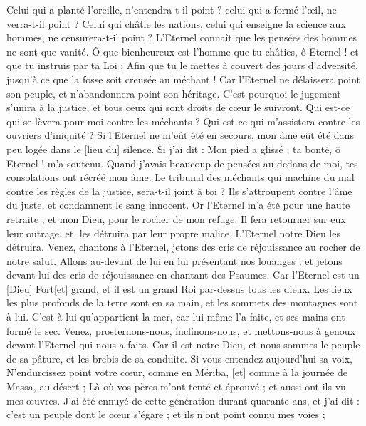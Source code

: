 \begin{multicols}{2}
Celui qui a planté l'oreille, n'entendra-t-il point ? celui qui a formé l'œil, ne verra-t-il point ?
Celui qui châtie les nations, celui qui enseigne la science aux hommes, ne censurera-t-il point ?
L'Eternel connaît que les pensées des hommes ne sont que vanité.
Ô que bienheureux est l'homme que tu châties, ô Eternel ! et que tu instruis par ta Loi ;
Afin que tu le mettes à couvert des jours d'adversité, jusqu’à ce que la fosse soit creusée au méchant !
Car l'Eternel ne délaissera point son peuple, et n'abandonnera point son héritage.
C'est pourquoi le jugement s'unira à la justice, et tous ceux qui sont droits de cœur le suivront.
Qui est-ce qui se lèvera pour moi contre les méchants ? Qui est-ce qui m'assistera contre les ouvriers d'iniquité ?
Si l'Eternel ne m'eût été en secours, mon âme eût été dans peu logée dans le [lieu du] silence.
Si j'ai dit : Mon pied a glissé ; ta bonté, ô Eternel ! m'a soutenu.
Quand j'avais beaucoup de pensées au-dedans de moi, tes consolations ont récréé mon âme.
Le tribunal des méchants qui machine du mal contre les règles de la justice, sera-t-il joint à toi ?
Ils s'attroupent contre l'âme du juste, et condamnent le sang innocent.
Or l'Eternel m'a été pour une haute retraite ; et mon Dieu, pour le rocher de mon refuge.
Il fera retourner sur eux leur outrage, et, les détruira par leur propre malice. L'Eternel notre Dieu les détruira.
\VerseOne{}Venez, chantons à l'Eternel, jetons des cris de réjouissance au rocher de notre salut.
Allons au-devant de lui en lui présentant nos louanges ; et jetons devant lui des cris de réjouissance en chantant des Psaumes.
Car l'Eternel est un [Dieu] Fort[et] grand, et il est un grand Roi par-dessus tous les dieux.
Les lieux les plus profonds de la terre sont en sa main, et les sommets des montagnes sont à lui.
C'est à lui qu'appartient la mer, car lui-même l'a faite, et ses mains ont formé le sec.
Venez, prosternons-nous, inclinons-nous, et mettons-nous à genoux devant l'Eternel qui nous a faits.
Car il est notre Dieu, et nous sommes le peuple de sa pâture, et les brebis de sa conduite. Si vous entendez aujourd'hui sa voix,
N'endurcissez point votre cœur, comme en Mériba, [et] comme à la journée de Massa, au désert ;
Là où vos pères m'ont tenté et éprouvé ; et aussi ont-ils vu mes œuvres.
J'ai été ennuyé de cette génération durant quarante ans, et j'ai dit : c'est un peuple dont le cœur s'égare ; et ils n'ont point connu mes voies ;

\end{multicols}
